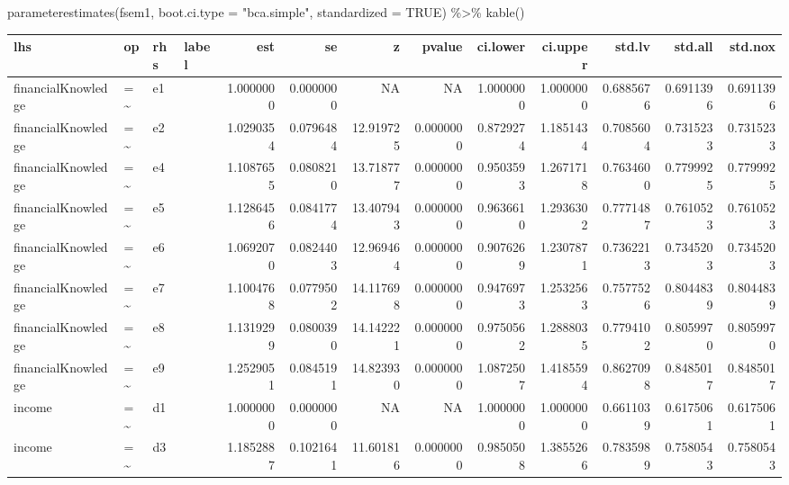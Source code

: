 \documentclass[
  super,
  preprint,
  3p]{elsarticle}
\newenvironment{Shaded}{\begin{snugshade}}{\end{snugshade}}
\newcommand{\AttributeTok}[1]{\textcolor[rgb]{0.40,0.45,0.13}{#1}}
\newcommand{\ConstantTok}[1]{\textcolor[rgb]{0.56,0.35,0.01}{#1}}
\newcommand{\FunctionTok}[1]{\textcolor[rgb]{0.28,0.35,0.67}{#1}}
\newcommand{\NormalTok}[1]{\textcolor[rgb]{0.00,0.23,0.31}{#1}}
\newcommand{\SpecialCharTok}[1]{\textcolor[rgb]{0.37,0.37,0.37}{#1}}
\newcommand{\StringTok}[1]{\textcolor[rgb]{0.13,0.47,0.30}{#1}}
\begin{document}
\begin{Shaded}
\begin{Highlighting}[]
\FunctionTok{parameterestimates}\NormalTok{(fsem1, }\AttributeTok{boot.ci.type =} \StringTok{"bca.simple"}\NormalTok{, }\AttributeTok{standardized =} \ConstantTok{TRUE}\NormalTok{) }\SpecialCharTok{\%\textgreater{}\%} 
  \FunctionTok{kable}\NormalTok{()}
\end{Highlighting}
\end{Shaded}

\begin{tabular}{l|l|l|l|r|r|r|r|r|r|r|r|r}
\hline
lhs & op & rhs & label & est & se & z & pvalue & ci.lower & ci.upper & std.lv & std.all & std.nox\\
\hline
financialKnowledge & =\textasciitilde{} & e1 &  & 1.0000000 & 0.0000000 & NA & NA & 1.0000000 & 1.0000000 & 0.6885676 & 0.6911396 & 0.6911396\\
\hline
financialKnowledge & =\textasciitilde{} & e2 &  & 1.0290354 & 0.0796484 & 12.919725 & 0.0000000 & 0.8729274 & 1.1851434 & 0.7085604 & 0.7315233 & 0.7315233\\
\hline
financialKnowledge & =\textasciitilde{} & e4 &  & 1.1087655 & 0.0808210 & 13.718777 & 0.0000000 & 0.9503593 & 1.2671718 & 0.7634600 & 0.7799925 & 0.7799925\\
\hline
financialKnowledge & =\textasciitilde{} & e5 &  & 1.1286456 & 0.0841774 & 13.407943 & 0.0000000 & 0.9636610 & 1.2936302 & 0.7771487 & 0.7610523 & 0.7610523\\
\hline
financialKnowledge & =\textasciitilde{} & e6 &  & 1.0692070 & 0.0824403 & 12.969464 & 0.0000000 & 0.9076269 & 1.2307871 & 0.7362213 & 0.7345203 & 0.7345203\\
\hline
financialKnowledge & =\textasciitilde{} & e7 &  & 1.1004768 & 0.0779502 & 14.117698 & 0.0000000 & 0.9476973 & 1.2532563 & 0.7577526 & 0.8044839 & 0.8044839\\
\hline
financialKnowledge & =\textasciitilde{} & e8 &  & 1.1319299 & 0.0800390 & 14.142221 & 0.0000000 & 0.9750562 & 1.2888035 & 0.7794102 & 0.8059970 & 0.8059970\\
\hline
financialKnowledge & =\textasciitilde{} & e9 &  & 1.2529051 & 0.0845191 & 14.823930 & 0.0000000 & 1.0872507 & 1.4185594 & 0.8627098 & 0.8485017 & 0.8485017\\
\hline
income & =\textasciitilde{} & d1 &  & 1.0000000 & 0.0000000 & NA & NA & 1.0000000 & 1.0000000 & 0.6611039 & 0.6175061 & 0.6175061\\
\hline
income & =\textasciitilde{} & d3 &  & 1.1852887 & 0.1021641 & 11.601816 & 0.0000000 & 0.9850508 & 1.3855266 & 0.7835989 & 0.7580543 & 0.7580543\\

\end{tabular}
\end{document}
